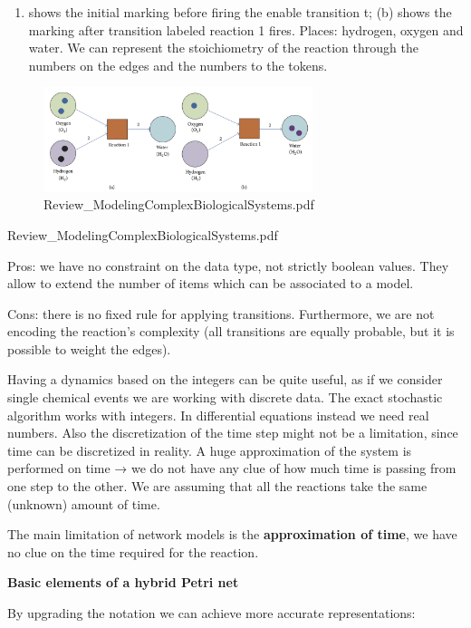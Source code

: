 \begin{enumerate}
\def\labelenumi{(\alph{enumi})}
\tightlist
\item
  shows the initial marking before firing the enable transition t; (b)
  shows the marking after transition labeled reaction 1 fires. Places:
  hydrogen, oxygen and water. We can represent the stoichiometry of the
  reaction through the numbers on the edges and the numbers to the
  tokens.
\end{enumerate}

\begin{figure}
\centering
\includegraphics[width=0.7\textwidth]{1_images/example_petri.png}
\caption{Review\_ModelingComplexBiologicalSystems.pdf}
\end{figure}

Review\_ModelingComplexBiologicalSystems.pdf

Pros: we have no constraint on the data type, not strictly boolean
values. They allow to extend the number of items which can be associated
to a model.

Cons: there is no fixed rule for applying transitions. Furthermore, we
are not encoding the reaction's complexity (all transitions are equally
probable, but it is possible to weight the edges).

Having a dynamics based on the integers can be quite useful, as if we
consider single chemical events we are working with discrete data. The
exact stochastic algorithm works with integers. In differential
equations instead we need real numbers. Also the discretization of the
time step might not be a limitation, since time can be discretized in
reality. A huge approximation of the system is performed on time → we do
not have any clue of how much time is passing from one step to the
other. We are assuming that all the reactions take the same (unknown)
amount of time.

The main limitation of network models is the \textbf{approximation of
time}, we have no clue on the time required for the reaction.

\textbf{Basic elements of a hybrid Petri net}

By upgrading the notation we can achieve more accurate representations:

